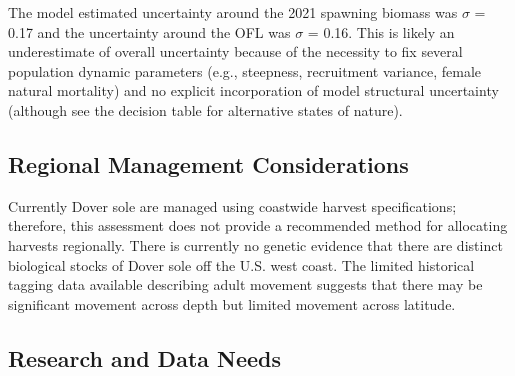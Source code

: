 \documentclass[11pt,
  english,
  a4paper,
]{article}
\begin{document}
\leavevmode\tagmcend\tagstructend


The model estimated uncertainty around the 2021 spawning biomass was {\(\sigma\)\leavevmode\tagmcend\tagstructend} = 0.17 and the uncertainty around the OFL was {\(\sigma\)\leavevmode\tagmcend\tagstructend} = 0.16. This is likely an underestimate of overall uncertainty because of the necessity to fix several population dynamic parameters (e.g., steepness, recruitment variance, female natural mortality) and no explicit incorporation of model structural uncertainty (although see the decision table for alternative states of nature).

\leavevmode\tagmcend\tagstructend\par


\hypertarget{regional-management-considerations}{%
\subsection{Regional Management Considerations}\label{regional-management-considerations}}

\leavevmode\tagmcend\tagstructend


Currently Dover sole are managed using coastwide harvest specifications; therefore, this assessment does not provide a recommended method for allocating harvests regionally. There is currently no genetic evidence that there are distinct biological stocks of Dover sole off the U.S. west coast. The limited historical tagging data available describing adult movement suggests that there may be significant movement across depth but limited movement across latitude.

\leavevmode\tagmcend\tagstructend\par


\hypertarget{research-and-data-needs-1}{%
\subsection{Research and Data Needs}\label{research-and-data-needs-1}}

\leavevmode\tagmcend\tagstructend
\end{document}
